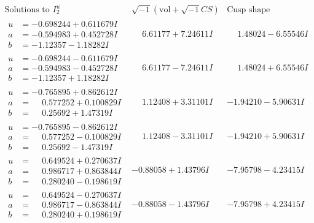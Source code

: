 \documentclass[1p]{elsarticle_modified}
\theoremstyle{definition}
\newcommand{\I}{\sqrt{-1}}
\begin{document}
$$\begin{array}{c|c|c}  
\text{Solutions to }I^u_{2}& \I (\text{vol} + \sqrt{-1}CS) & \text{Cusp shape}\\
 \hline 
\begin{aligned}
u &= -0.698244 + 0.611679 I \\
a &= -0.594983 + 0.452728 I \\
b &= -1.12357 - 1.18282 I\end{aligned}
 & \phantom{-}6.61177 + 7.24611 I & \phantom{-}1.48024 - 6.55546 I \\ \hline\begin{aligned}
u &= -0.698244 - 0.611679 I \\
a &= -0.594983 - 0.452728 I \\
b &= -1.12357 + 1.18282 I\end{aligned}
 & \phantom{-}6.61177 - 7.24611 I & \phantom{-}1.48024 + 6.55546 I \\ \hline\begin{aligned}
u &= -0.765895 + 0.862612 I \\
a &= \phantom{-}0.577252 + 0.100829 I \\
b &= \phantom{-}0.25692 + 1.47319 I\end{aligned}
 & \phantom{-}1.12408 + 3.31101 I & -1.94210 - 5.90631 I \\ \hline\begin{aligned}
u &= -0.765895 - 0.862612 I \\
a &= \phantom{-}0.577252 - 0.100829 I \\
b &= \phantom{-}0.25692 - 1.47319 I\end{aligned}
 & \phantom{-}1.12408 - 3.31101 I & -1.94210 + 5.90631 I \\ \hline\begin{aligned}
u &= \phantom{-}0.649524 + 0.270637 I \\
a &= \phantom{-}0.986717 + 0.863844 I \\
b &= \phantom{-}0.280240 - 0.198619 I\end{aligned}
 & -0.88058 + 1.43796 I & -7.95798 - 4.23415 I \\ \hline\begin{aligned}
u &= \phantom{-}0.649524 - 0.270637 I \\
a &= \phantom{-}0.986717 - 0.863844 I \\
b &= \phantom{-}0.280240 + 0.198619 I\end{aligned}
 & -0.88058 - 1.43796 I & -7.95798 + 4.23415 I \\ \hline\begin{aligned}

\end{aligned}
\end{array}$$
\end{document}
